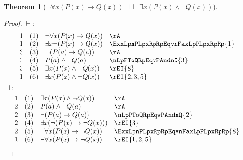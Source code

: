 \documentclass{book}
\theoremstyle{plain}
\newtheorem{theorem}{Theorem}
\theoremstyle{remark}
\theoremstyle{definition}
\begin{document}
\label{nFaxLpPLpxRpToQLpxRpRpEqvExxLpPLpxRpAndnQLpxRpRp}
\begin{theorem}[\(\neg\forall x(P(x)\rightarrow Q(x)) \dashv\vdash \exists x (P(x)\land  \neg Q(x))\)]
\end{theorem}
\begin{proof}
	\(\vdash:\)
	\[
	\begin{array}{llll}
		1 & (1) & \neg\forall x(P(x)\rightarrow Q(x)) & \rA \\
		1 & (2) & \exists x \neg (P(x)\rightarrow Q(x)) & \ExxLpnPLpxRpRpEqvnFaxLpPLpxRpRp{1} \\
		3 & (3) & \neg (P(a)\rightarrow Q(a)) & \rA \\
		3 & (4) & P(a)\land \neg Q(a) &  \nLpPToQRpEqvPAndnQ{3} \\
		3 & (5) & \exists x(P(x)\land \neg Q(x)) & \rEI{8} \\
		1 & (6) & \exists x(P(x)\land \neg Q(x)) & \rEI{2,3,5} \\
	\end{array}
	\]
	\(\dashv:\)
	\[
	\begin{array}{llll}
		1 & (1) & \exists x (P(x)\wedge \neg Q(x)) & \rA \\
		2 & (2) & P(a)\wedge \neg Q(a) & \rA \\
		2 & (3) & \neg(P(a)\rightarrow Q(a)) & \nLpPToQRpEqvPAndnQ{2} \\
		2 & (4) & \exists x(\neg(P(x)\rightarrow \neg Q(x))) & \rEI{3} \\
		2 & (5) & \neg\forall x(P(x)\rightarrow \neg Q(x)) & \ExxLpnPLpxRpRpEqvnFaxLpPLpxRpRp{8} \\
		1 & (6) & \neg\forall x(P(x)\rightarrow \neg Q(x)) & \rEI{1,2,5} \\
	\end{array}
	\]
\end{proof}
\end{document}
